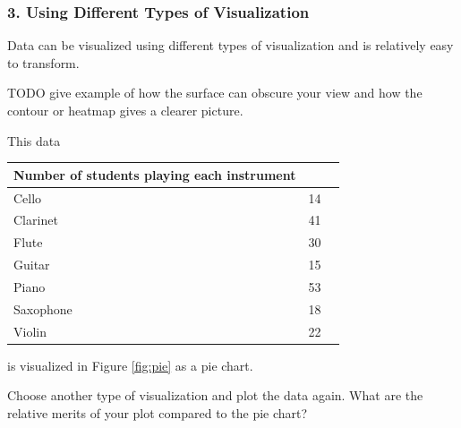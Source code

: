 \subsubsection*{3. Using Different Types of Visualization}

Data can be visualized using different types of visualization and is relatively easy to transform.

TODO give example of how the surface can obscure your view and how the contour or heatmap gives a clearer picture.
\begin{problem}
This data

\begin{tabular}{ | l || l | l | }
\hline
Number of students playing each instrument  & \\
\hline
Cello & 14 \\
Clarinet & 41 \\
Flute & 30 \\
Guitar & 15 \\
Piano & 53 \\
Saxophone & 18 \\
Violin & 22 \\
\hline
\end{tabular}

 is visualized in Figure \ref{fig:pie} as a pie chart.

Choose another type of visualization and plot the data again. What are the relative merits of your plot compared to the pie chart?
\label{prob:differentVisualizations}
\end{problem}

